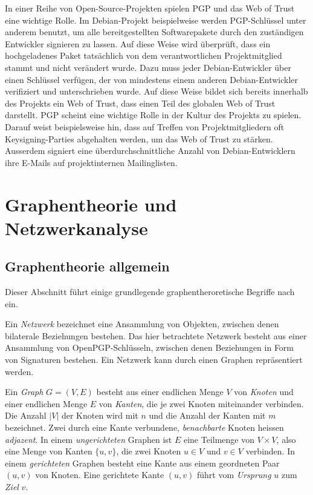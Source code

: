 In einer Reihe von Open-Source-Projekten spielen PGP und das Web of
Trust eine wichtige Rolle. Im Debian-Projekt beispielweise werden
PGP-Schl\"ussel unter anderem benutzt, um alle bereitgestellten
Softwarepakete durch den zust\"andigen Entwickler signieren zu
lassen. Auf diese Weise wird \"uberpr\"uft, dass ein hochgeladenes
Paket tats\"achlich von dem verantwortlichen Projektmitglied stammt
und nicht ver\"andert wurde. Dazu muss jeder Debian-Entwickler \"uber
einen Schl\"ussel verf\"ugen, der von mindestens einem anderen
Debian-Entwickler verifiziert und unterschrieben wurde. Auf diese
Weise bildet sich bereits innerhalb des Projekts ein Web of Trust,
dass einen Teil des globalen Web of Trust darstellt. PGP scheint eine
wichtige Rolle in der Kultur des Projekts zu spielen. Darauf weist
beispielsweise hin, dass auf Treffen von Projektmitgliedern oft
Keysigning-Parties abgehalten werden, um das Web of Trust zu
st\"arken. Ausserdem signiert eine \"uberdurchschnittliche Anzahl von
Debian-Entwicklern ihre E-Mails auf projektinternen Mailinglisten.

\section{Graphentheorie und Netzwerkanalyse}
\label{sec:graph-und-netzw}

\subsection{Graphentheorie allgemein}
\label{ch:Grundlagen:sec:Graphentheorie}

Dieser Abschnitt f\"uhrt einige grundlegende graphentheroretische
Begriffe nach \cite{Brandes2004} ein.
  
Ein \emph{Netzwerk} bezeichnet eine Ansammlung von Objekten, zwischen
denen bilaterale Beziehungen bestehen. Das hier betrachtete Netzwerk
besteht aus einer Ansammlung von OpenPGP-Schl\"usseln, zwischen denen
Beziehungen in Form von Signaturen bestehen. Ein Netzwerk kann durch einen
Graphen repr\"asentiert werden.

Ein \emph{Graph} $G=(V, E)$ besteht aus einer endlichen Menge $V$ von
\emph{Knoten} und einer endlichen Menge $E$ von \emph{Kanten}, die je
zwei Knoten miteinander verbinden. Die Anzahl $|V|$ der Knoten wird mit
$n$ und die Anzahl der Kanten mit $m$ bezeichnet. Zwei durch eine
Kante verbundene, \emph{benachbarte} Knoten heissen
\emph{adjazent}. In einem \emph{ungerichteten} Graphen ist $E$ eine
Teilmenge von $V\times V$, also eine Menge von Kanten $\{u, v\}$, die
zwei Knoten $u \in V$ und $v\in V$ verbinden. In einem
\emph{gerichteten} Graphen besteht eine Kante aus einem geordneten
Paar $(u, v)$ von Knoten. Eine gerichtete Kante $(u, v)$ f\"uhrt vom
\emph{Ursprung} $u$ zum \emph{Ziel} $v$.

